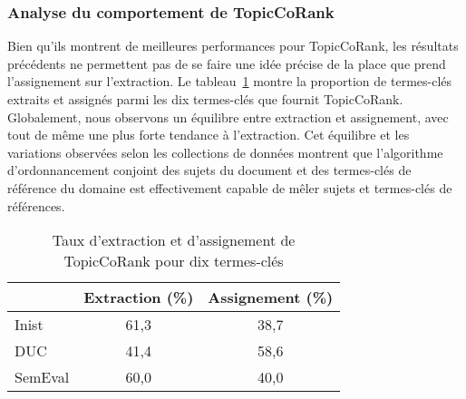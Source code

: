       \subsubsection{Analyse du comportement de TopicCoRank}
      \label{subsubsec:main-automatic_keyphrase_annotation-supervised_automatic_keyphrase_annotation-evaluation-topiccorank-analysis}
        Bien qu'ils montrent de meilleures performances pour TopicCoRank, les
        résultats précédents ne permettent pas de se faire une idée précise de
        la place que prend l'assignement sur l'extraction. Le
        tableau~\ref{tab:assignment_ratio} montre la proportion de termes-clés
        extraits et assignés parmi les dix termes-clés que fournit TopicCoRank.
        Globalement, nous observons un équilibre entre extraction et
        assignement, avec tout de même une plus forte tendance à l'extraction.
        Cet équilibre et les variations observées selon les collections de
        données montrent que l'algorithme d'ordonnancement conjoint des sujets
        du document et des termes-clés de référence du domaine est effectivement
        capable de mêler sujets et termes-clés de références.
        \begin{table}[!h]
          \centering
          \begin{tabular}{l|cc}
              \toprule
              & Extraction (\%) & Assignement (\%)\\
              \hline
              Inist & 61,3 & 38,7\\
              DUC & 41,4 & 58,6\\
              SemEval & 60,0 & 40,0\\
              \bottomrule
          \end{tabular}
          \caption{Taux d'extraction et d'assignement de TopicCoRank pour dix
                   termes-clés
                   \label{tab:assignment_ratio}}
        \end{table}

